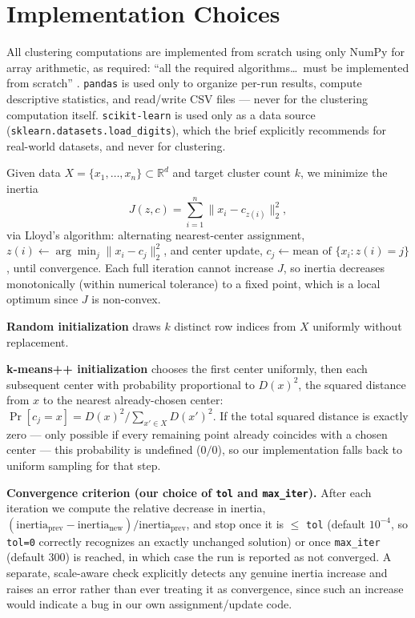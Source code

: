 \documentclass[a4paper,11pt]{article}
\begin{document}
\section{Implementation Choices}
\label{sec:implementation}

All clustering computations are implemented from scratch using only NumPy for array
arithmetic, as required: ``all the required algorithms\dots\ must be implemented from
scratch'' \cite{smml_assignment5}. \texttt{pandas} is used only to organize per-run results,
compute descriptive statistics, and read/write CSV files --- never for the clustering
computation itself. \texttt{scikit-learn} is used only as a data source
(\texttt{sklearn.datasets.load\_digits}), which the brief explicitly recommends for
real-world datasets, and never for clustering.

Given data $X=\{x_1,\dots,x_n\}\subset\mathbb{R}^d$ and target cluster count $k$, we minimize
the inertia
\begin{equation}
J(z,c) = \sum_{i=1}^{n} \lVert x_i - c_{z(i)} \rVert_2^2 ,
\label{eq:inertia}
\end{equation}
via Lloyd's algorithm: alternating nearest-center assignment,
$z(i) \leftarrow \arg\min_j \lVert x_i - c_j\rVert_2^2$, and center update,
$c_j \leftarrow \text{mean of } \{x_i : z(i)=j\}$, until convergence. Each full iteration cannot
increase $J$, so inertia decreases monotonically (within numerical tolerance) to a fixed
point, which is a local optimum since $J$ is non-convex.

\textbf{Random initialization} draws $k$ distinct row indices from $X$ uniformly without
replacement.

\textbf{k-means++ initialization} \cite{arthur2007kmeanspp} chooses the first center
uniformly, then each subsequent center with probability proportional to $D(x)^2$, the
squared distance from $x$ to the nearest already-chosen center:
$\Pr[c_j = x] = D(x)^2 / \sum_{x'\in X} D(x')^2$. If the total squared distance is exactly
zero --- only possible if every remaining point already coincides with a chosen center ---
this probability is undefined ($0/0$), so our implementation falls back to uniform sampling
for that step.

\textbf{Convergence criterion (our choice of \texttt{tol} and \texttt{max\_iter}).} After each
iteration we compute the relative decrease in inertia,
$(\text{inertia}_{\text{prev}} - \text{inertia}_{\text{new}})/\text{inertia}_{\text{prev}}$, and
stop once it is $\leq$ \texttt{tol} (default $10^{-4}$, so \texttt{tol=0} correctly recognizes
an exactly unchanged solution) or once \texttt{max\_iter} (default 300) is reached, in which
case the run is reported as not converged. A separate, scale-aware check explicitly detects
any genuine inertia increase and raises an error rather than ever treating it as convergence,
since such an increase would indicate a bug in our own assignment/update code.
\end{document}
